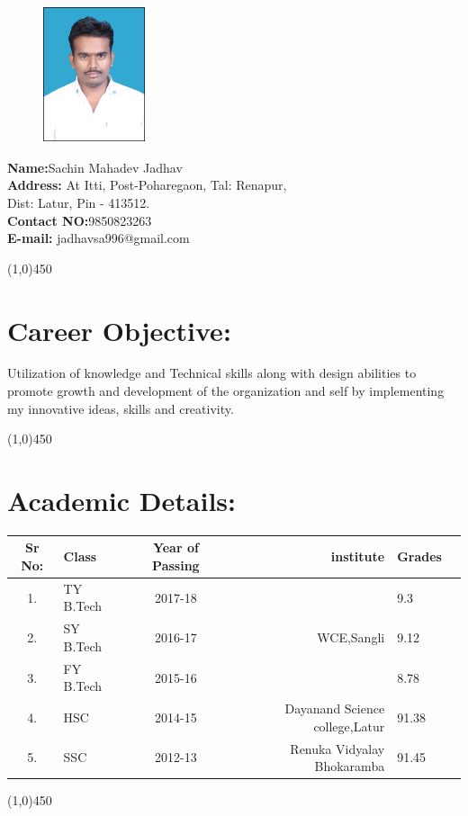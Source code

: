 \documentclass[16pt,a4paper]{article}
\begin{document}
 \begin{figure}
 	\vspace{-60pt}
    \includegraphics[width=3cm,height=4cm]{said.jpg}
 \end{figure}
        \textbf{Name:}Sachin Mahadev Jadhav\\
        \textbf{Address:} At Itti, Post-Poharegaon, Tal: Renapur,\\ Dist: Latur, Pin - 413512.\\
        \textbf{Contact NO:}9850823263\\
        \textbf{E-mail:} {jadhavsa996@gmail.com} 
       \begin{center}
       	 \line(1,0){450}
       \end{center}
     \section{Career Objective:} 
 	  Utilization of knowledge and Technical skills along with design abilities to promote growth and development of the organization and self by implementing my innovative ideas, skills and creativity.
   \begin{center}
   	\line(1,0){450}
   \end{center}
 \section{Academic Details:} 
\begin{tabular}{||c|l|c|r|l|l||}
	\hline
	Sr No:& Class & Year of Passing  & institute &Grades \\
	\hline
	1.&	TY B.Tech & 2017-18 &\multirow{3}{*}{WCE,Sangli}&9.3  \\
	2.&	SY B.Tech & 2016-17 &  &9.12 \\
	3.&	FY B.Tech & 2015-16 &  &8.78 \\
	4.&	HSC & 2014-15 & Dayanand Science college,Latur &91.38 \\
	5.&	SSC & 2012-13 & Renuka Vidyalay Bhokaramba &91.45 \\
	\hline
\end{tabular}
\begin{center}
	\line(1,0){450}
\end{center}
\end{document}
